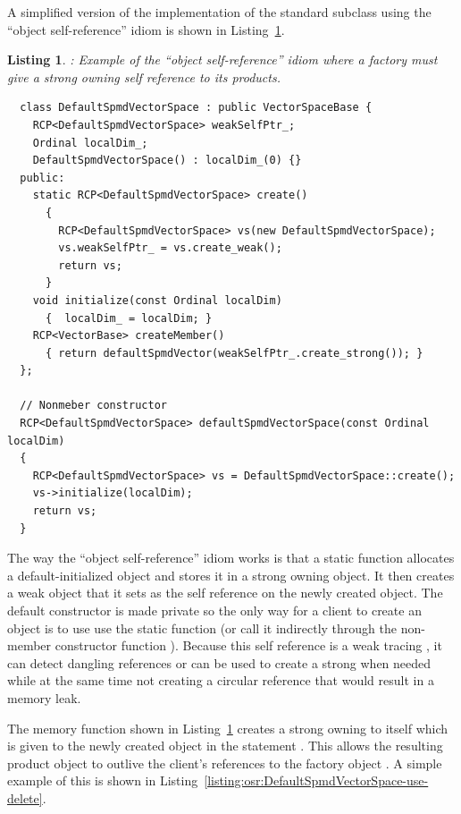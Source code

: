 \documentclass[pdf,ps2pdf,11pt]{SANDreport}
\newtheorem{listing}{Listing}
\begin{document}
A simplified version of the implementation of the
{} standard subclass
{} using the ``object self-reference''
idiom is shown in Listing~\ref{listing:osr:DefaultSpmdVectorSpace}.


\begin{listing}: Example of the ``object self-reference'' idiom where a
factory must give a strong owning {} self reference to its products.  \\
\label{listing:osr:DefaultSpmdVectorSpace}
{\small\begin{verbatim}
  class DefaultSpmdVectorSpace : public VectorSpaceBase {
    RCP<DefaultSpmdVectorSpace> weakSelfPtr_;
    Ordinal localDim_;
    DefaultSpmdVectorSpace() : localDim_(0) {}
  public:
    static RCP<DefaultSpmdVectorSpace> create()
      {
        RCP<DefaultSpmdVectorSpace> vs(new DefaultSpmdVectorSpace);
        vs.weakSelfPtr_ = vs.create_weak();
        return vs;
      }
    void initialize(const Ordinal localDim)
      {  localDim_ = localDim; }
    RCP<VectorBase> createMember()
      { return defaultSpmdVector(weakSelfPtr_.create_strong()); }
  };

  // Nonmeber constructor
  RCP<DefaultSpmdVectorSpace> defaultSpmdVectorSpace(const Ordinal localDim)
  {
    RCP<DefaultSpmdVectorSpace> vs = DefaultSpmdVectorSpace::create();
    vs->initialize(localDim);
    return vs;
  }
\end{verbatim}}
\end{listing}


The way the ``object self-reference'' idiom works is that a static
function {} allocates a default-initialized
{} object and stores it in a strong owning
{} object.  It then creates a weak {} object that it
sets as the self reference on the newly created
{} object.  The default constructor is
made private so the only way for a client to create an
{} object is to use use the static
{} function (or call it indirectly through the
non-member constructor function {}).
Because this self reference is a weak tracing {}, it can
detect dangling references or can be used to create a strong
{} when needed while at the same time not creating a circular
reference that would result in a memory leak.

The memory function {} shown in
Listing~\ref{listing:osr:DefaultSpmdVectorSpace} creates a strong
owning {} to itself which is given to the newly created
{} object in the statement
{}.  This
allows the resulting product {} object to
outlive the client's {} references to the factory object
{}.  A simple example of this is shown in
Listing~\ref{listing:osr:DefaultSpmdVectorSpace-use-delete}.
\end{document}
